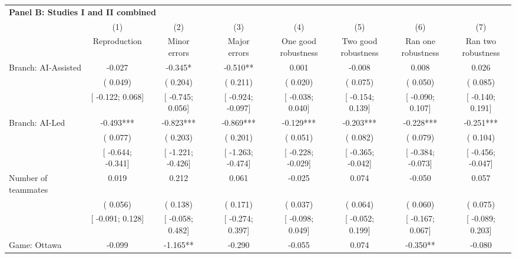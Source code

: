 \def\sym#1{\ifmmode^{#1}\else\(^{#1}\)\fi}
\begin{tabular}{l*{7}{c}}
\hline\hline
\multicolumn{8}{l}{\textbf{Panel B: Studies I and II combined}}\\
& (1) & (2) & (3) & (4) & (5) & (6) & (7)\\
                    &Reproduction   &\shortstack[c]{Minor\\errors}   &\shortstack[c]{Major\\errors}   &\shortstack[c]{One good\\robustness}   &\shortstack[c]{Two good\\robustness}   &\shortstack[c]{Ran one\\robustness}   &\shortstack[c]{Ran two\\robustness}   \\
\hline
Branch: AI-Assisted &   -0.027   &   -0.345*   &   -0.510**   &    0.001   &   -0.008   &    0.008   &    0.026   \\
                    &(    0.049)   &(    0.204)   &(    0.211)   &(    0.020)   &(    0.075)   &(    0.050)   &(    0.085)   \\
                    &[   -0.122;     0.068]   &[   -0.745;     0.056]   &[   -0.924;    -0.097]   &[   -0.038;     0.040]   &[   -0.154;     0.139]   &[   -0.090;     0.107]   &[   -0.140;     0.191]   \\
Branch: AI-Led &   -0.493***   &   -0.823***   &   -0.869***   &   -0.129***   &   -0.203***   &   -0.228***   &   -0.251***   \\
                    &(    0.077)   &(    0.203)   &(    0.201)   &(    0.051)   &(    0.082)   &(    0.079)   &(    0.104)   \\
                    &[   -0.644;    -0.341]   &[   -1.221;    -0.426]   &[   -1.263;    -0.474]   &[   -0.228;    -0.029]   &[   -0.365;    -0.042]   &[   -0.384;    -0.073]   &[   -0.456;    -0.047]   \\
Number of teammates &    0.019   &    0.212   &    0.061   &   -0.025   &    0.074   &   -0.050   &    0.057   \\
                    &(    0.056)   &(    0.138)   &(    0.171)   &(    0.037)   &(    0.064)   &(    0.060)   &(    0.075)   \\
                    &[   -0.091;     0.128]   &[   -0.058;     0.482]   &[   -0.274;     0.397]   &[   -0.098;     0.049]   &[   -0.052;     0.199]   &[   -0.167;     0.067]   &[   -0.089;     0.203]   \\
Game: Ottawa &   -0.099   &   -1.165**   &   -0.290   &   -0.055   &    0.074   &   -0.350**   &   -0.080   \\

\end{tabular}

